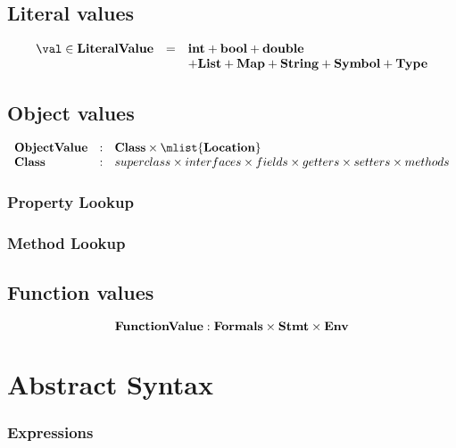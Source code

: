 \documentclass{article}
\begin{document}
\subsection{Literal values}
\label{subsubsec:literal-values}
\[
  \begin{array}{lcl}
	\val \in \dlitval &=& \mathbf{int} + \mathbf{bool} + \mathbf{double}\\
	&& + \mathbf{List} + \mathbf{Map} + \mathbf{String} + \mathbf{Symbol} + \mathbf{Type}
  \end{array}
\]
\subsection{Object values}
\label{subsec:object-values}
\[
  \begin{array}{lcl}
	\dobjval &:& \dclass \times \mlist{\dlocation}\\
	\dclass &:& superclass \times interfaces \times fields \times getters \times setters \times methods
  \end{array}
\]

\subsubsection{Property Lookup}
\label{subsubsec:property-lookup}

\subsubsection{Method Lookup}
\label{subsubsec:method-lookup}

\subsection{Function values}
\label{subsec:function-values}
\[
	\mathbf{FunctionValue} : \mathbf{Formals} \times \mathbf{Stmt} \times \mathbf{Env}
\]

\section{Abstract Syntax}
\label{sec:abstract-syntax}

\subsubsection{Expressions}
\label{sec:expr-syntax}

\newcommand{\expressionmeta}{\ensuremath{\mathit{E}}}
\newcommand{\expressionsmeta}{\expressionmeta{s}}
\newcommand{\variablemeta}{\ensuremath{\mathit{X}}}
\newcommand{\boolmeta}{\ensuremath{\mathit{B}}}
\newcommand{\integermeta}{\ensuremath{\mathit{I}}}
\newcommand{\doublemeta}{\ensuremath{\mathit{D}}}
\newcommand{\stringmeta}{\ensuremath{\mathit{S}}}
\newcommand{\idmeta}{\ensuremath{\mathit{X}}}
\newcommand{\membermeta}{\ensuremath{\mathit{M}}}
\newcommand{\typemeta}{\ensuremath{\mathit{T}}}
\end{document}
